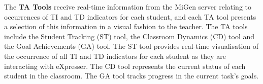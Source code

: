The {\bf TA Tools}
receive real-time information from the MiGen server relating to
occurrences of TI and TD indicators for each student, and each TA tool
presents a selection of this information in a visual fashion to the
teacher. The TA tools include the Student Tracking (ST) tool, the
Classroom Dynamics (CD) tool and the Goal Achievements (GA) tool. The
ST tool provides real-time visualisation of the occurrence of all TI
and TD indicators for each student as they are interacting with
eXpresser. 
The CD tool represents the current status of each student in the
classroom. 
% 
The GA tool tracks progress in the current task's goals. 


